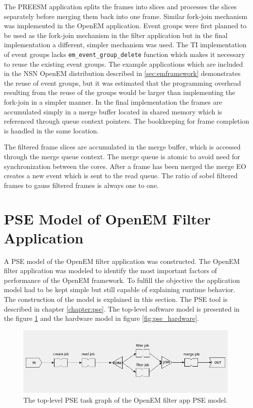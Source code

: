The PREESM application splits the frames into slices and processes the slices
separately before merging them back into one frame. Similar fork-join mechanism
was implemented in the OpenEM application. Event groups were first planned to be
used as the fork-join mechanism in the filter application but in the final
implementation a different, simpler mechanism was used. The TI implementation of
event groups lacks \texttt{em\_event\_group\_delete} function which makes it
necessary to reuse the existing event groups. The example applications which are
included in the NSN OpenEM distribution described in \ref{sec:emframework}
demonstrates the reuse of event groups, but it was estimated that the
programming overhead resulting from the reuse of the groups would be larger than
implementing the fork-join in a simpler manner. In the final implementation the
frames are accumulated simply in a merge buffer located in shared memory which
is referenced through queue context pointers. The bookkeeping for frame
completion is handled in the same location.

The filtered frame slices are accumulated in the merge buffer, which is accessed
through the merge queue context. The merge queue is atomic to avoid need for
synchronization between the cores. After a frame has been merged the merge EO
creates a new event which is sent to the read queue. The ratio of sobel filtered
frames to gauss filtered frames is always one to one.

\section{PSE Model of OpenEM Filter Application}
\label{sec:pse_model}
A PSE model of the OpenEM filter application was constructed. The OpenEM filter
application was modeled to identify the most important factors of performance of
the OpenEM framework. To fulfill the objective the application model had to be
kept simple but still capable of explaining runtime behavior. The construction
of the model is explained in this section. The PSE tool is described in chapter
\ref{chapter:pse}. The top-level software model is presented in the figure
\ref{fig:pse_application} and the hardware model in figure
\ref{fig:pse_hardware}.

\begin{figure}[h!]
    \begin{center}
        \includegraphics[width=0.99\textwidth]{images/pse_filterapp.png}
        \caption{The top-level PSE task graph of the OpenEM filter app PSE
        model.}
        \label{fig:pse_application}
    \end{center}
\end{figure}

